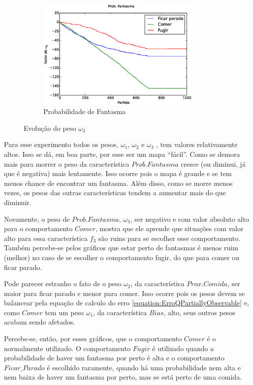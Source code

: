 \begin{figure}[h]
	\centering
	\begin{subfigure}[t]{.5\textwidth}
		\centering
		\includegraphics[width=80mm]{images/3_behaviors_original_map/weights____pol__ProbFantasma}
		\caption{Probabilidade de Fantasma}
	\end{subfigure}
	\caption{Evolução do peso $ \omega_3 $}
	\label{img:3ComportamentosMapaOriginal:PesoProbFantasma}
\end{figure}

Para esse experimento todos os pesos, $ \omega_1 $, $ \omega_2 $ e $ \omega_3 $ , tem valores relativamente altos. Isso se dá, em boa parte, por esse ser um mapa ``fácil''. Como se demora mais para morrer o peso da característica $ Prob. Fantasma $ cresce (ou diminui, já que é negativa) mais lentamente. Isso ocorre pois o mapa é grande e se tem menos chance de encontrar um fantasma. Além disso, como se morre menos vezes, os pesos das outras características tendem a aumentar mais do que diminuir.

Novamente, o peso de $ Prob.Fantasma $, $ \omega_3 $, ser negativo e com valor absoluto alto para o comportamento $ Comer $, mostra que ele aprende que situações com valor alto para essa característica $ f_3 $ são ruins para se escolher esse comportamento. Também percebe-se pelos gráficos que estar perto de fantasmas é menos ruim (melhor) no caso de se escolher o comportamento fugir, do que para comer ou ficar parado.

Pode parecer estranho o fato de o peso $ \omega_2 $, da característica $ Prox. Comida $, ser maior para ficar parado e menor para comer. Isso ocorre pois os pesos devem se balancear pela equação de calculo do erro \ref{equation:ErroQPartiallyObservable} e, como $ Comer $ tem um peso $ \omega_1 $, da característica $ Bias $, alto, seus outros pesos acabam sendo afetados.

Percebe-se, então, por esses gráficos, que o comportamento $ Comer $ é o normalmente utilizado. O comportamento $ Fugir $ é utilizado quando a probabilidade de haver um fantasma por perto é alta e o comportamento $ Ficar\_Parado $ é escolhido raramente, quando há uma probabilidade nem alta e nem baixa de haver um fantasma por perto, mas se está perto de uma comida.

